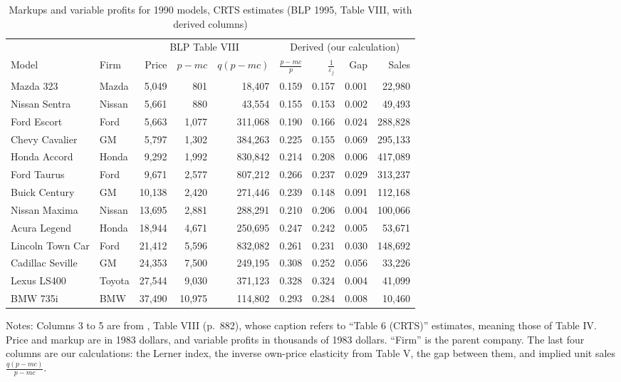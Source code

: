\begin{table}[htbp]
\centering
\caption{Markups and variable profits for 1990 models, CRTS estimates (BLP 1995, Table VIII, with
derived columns)}
\label{tab:08-blp-markups}
\footnotesize
\setlength{\tabcolsep}{4pt}
\begin{tabular}{@{}llrrrrrrr@{}}
\toprule
 & & \multicolumn{3}{c}{BLP Table VIII} & \multicolumn{4}{c}{Derived (our calculation)} \\
\cmidrule(lr){3-5}\cmidrule(l){6-9}
Model & Firm & Price & $p-mc$ & $q(p-mc)$ & $\frac{p-mc}{p}$ & $\frac{1}{\varepsilon_j}$ & Gap
 & Sales \\
\midrule
Mazda 323        & Mazda  & 5,049  & 801    & 18,407  & 0.159 & 0.157 & 0.001 & 22,980 \\
Nissan Sentra    & Nissan & 5,661  & 880    & 43,554  & 0.155 & 0.153 & 0.002 & 49,493 \\
Ford Escort      & Ford   & 5,663  & 1,077  & 311,068 & 0.190 & 0.166 & 0.024 & 288,828 \\
Chevy Cavalier   & GM     & 5,797  & 1,302  & 384,263 & 0.225 & 0.155 & 0.069 & 295,133 \\
Honda Accord     & Honda  & 9,292  & 1,992  & 830,842 & 0.214 & 0.208 & 0.006 & 417,089 \\
Ford Taurus      & Ford   & 9,671  & 2,577  & 807,212 & 0.266 & 0.237 & 0.029 & 313,237 \\
Buick Century    & GM     & 10,138 & 2,420  & 271,446 & 0.239 & 0.148 & 0.091 & 112,168 \\
Nissan Maxima    & Nissan & 13,695 & 2,881  & 288,291 & 0.210 & 0.206 & 0.004 & 100,066 \\
Acura Legend     & Honda  & 18,944 & 4,671  & 250,695 & 0.247 & 0.242 & 0.005 & 53,671 \\
Lincoln Town Car & Ford   & 21,412 & 5,596  & 832,082 & 0.261 & 0.231 & 0.030 & 148,692 \\
Cadillac Seville & GM     & 24,353 & 7,500  & 249,195 & 0.308 & 0.252 & 0.056 & 33,226 \\
Lexus LS400      & Toyota & 27,544 & 9,030  & 371,123 & 0.328 & 0.324 & 0.004 & 41,099 \\
BMW 735i         & BMW    & 37,490 & 10,975 & 114,802 & 0.293 & 0.284 & 0.008 & 10,460 \\
\bottomrule
\end{tabular}

\smallskip
\begin{minipage}{0.97\linewidth}
\footnotesize
Notes: Columns 3 to 5 are from \citet{BerryLevinsohnPakes1995}, Table VIII (p.~882), whose
caption refers to ``Table 6 (CRTS)'' estimates, meaning those of Table IV. Price and markup are in 1983
dollars, and variable profits in thousands of 1983 dollars. ``Firm'' is the parent company. The last
four columns are our calculations: the Lerner index, the inverse own-price elasticity from Table V, the
gap between them, and implied unit sales $\frac{q(p-mc)}{p-mc}$.
\end{minipage}
\end{table}

